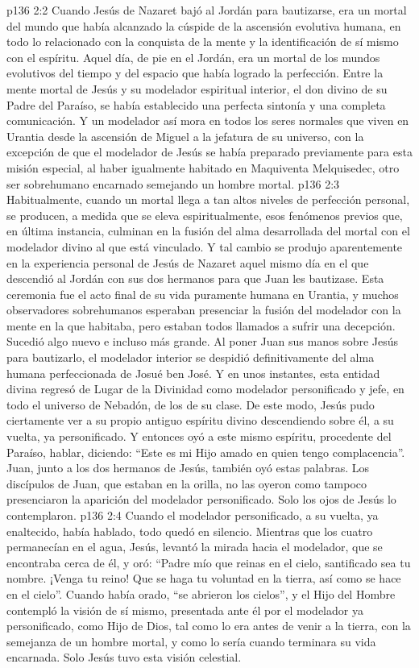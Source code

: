 \vs p136 2:2 \pc Cuando Jesús de Nazaret bajó al Jordán para bautizarse, era un mortal del mundo que había alcanzado la cúspide de la ascensión evolutiva humana, en todo lo relacionado con la conquista de la mente y la identificación de sí mismo con el espíritu. Aquel día, de pie en el Jordán, era un mortal de los mundos evolutivos del tiempo y del espacio que había logrado la perfección. Entre la mente mortal de Jesús y su modelador espiritual interior, el don divino de su Padre del Paraíso, se había establecido una perfecta sintonía y una completa comunicación. Y un modelador así mora en todos los seres normales que viven en Urantia desde la ascensión de Miguel a la jefatura de su universo, con la excepción de que el modelador de Jesús se había preparado previamente para esta misión especial, al haber igualmente habitado en Maquiventa Melquisedec, otro ser sobrehumano encarnado semejando un hombre mortal.
\vs p136 2:3 Habitualmente, cuando un mortal llega a tan altos niveles de perfección personal, se producen, a medida que se eleva espiritualmente, esos fenómenos previos que, en última instancia, culminan en la fusión del alma desarrollada del mortal con el modelador divino al que está vinculado. Y tal cambio se produjo aparentemente en la experiencia personal de Jesús de Nazaret aquel mismo día en el que descendió al Jordán con sus dos hermanos para que Juan les bautizase. Esta ceremonia fue el acto final de su vida puramente humana en Urantia, y muchos observadores sobrehumanos esperaban presenciar la fusión del modelador con la mente en la que habitaba, pero estaban todos llamados a sufrir una decepción. Sucedió algo nuevo e incluso más grande. Al poner Juan sus manos sobre Jesús para bautizarlo, el modelador interior se despidió definitivamente del alma humana perfeccionada de Josué ben José. Y en unos instantes, esta entidad divina regresó de Lugar de la Divinidad como modelador personificado y jefe, en todo el universo de Nebadón, de los de su clase. De este modo, Jesús pudo ciertamente ver a su propio antiguo espíritu divino descendiendo sobre él, a su vuelta, ya personificado. Y entonces oyó a este mismo espíritu, procedente del Paraíso, hablar, diciendo: “Este es mi Hijo amado en quien tengo complacencia”. Juan, junto a los dos hermanos de Jesús, también oyó estas palabras. Los discípulos de Juan, que estaban en la orilla, no las oyeron como tampoco presenciaron la aparición del modelador personificado. Solo los ojos de Jesús lo contemplaron.
\vs p136 2:4 \pc Cuando el modelador personificado, a su vuelta, ya enaltecido, había hablado, todo quedó en silencio. Mientras que los cuatro permanecían en el agua, Jesús, levantó la mirada hacia el modelador, que se encontraba cerca de él, y oró: “Padre mío que reinas en el cielo, santificado sea tu nombre. ¡Venga tu reino! Que se haga tu voluntad en la tierra, así como se hace en el cielo”. Cuando había orado, “se abrieron los cielos”, y el Hijo del Hombre contempló la visión de sí mismo, presentada ante él por el modelador ya personificado, como Hijo de Dios, tal como lo era antes de venir a la tierra, con la semejanza de un hombre mortal, y como lo sería cuando terminara su vida encarnada. Solo Jesús tuvo esta visión celestial.
